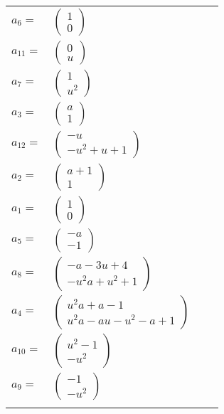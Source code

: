\documentclass[1p]{elsarticle_modified}
\theoremstyle{definition}
\begin{document}
\begin{tabular}{m{7pt} m{180pt} m{7pt} m{180pt} }
\flushright $a_{6}=$&$\begin{pmatrix}1\\0\end{pmatrix}$ \\
\flushright $a_{11}=$&$\begin{pmatrix}0\\u\end{pmatrix}$ \\
\flushright $a_{7}=$&$\begin{pmatrix}1\\u^2\end{pmatrix}$ \\
\flushright $a_{3}=$&$\begin{pmatrix}a\\1\end{pmatrix}$ \\
\flushright $a_{12}=$&$\begin{pmatrix}- u\\- u^2+u+1\end{pmatrix}$ \\
\flushright $a_{2}=$&$\begin{pmatrix}a+1\\1\end{pmatrix}$ \\
\flushright $a_{1}=$&$\begin{pmatrix}1\\0\end{pmatrix}$ \\
\flushright $a_{5}=$&$\begin{pmatrix}- a\\-1\end{pmatrix}$ \\
\flushright $a_{8}=$&$\begin{pmatrix}- a-3 u+4\\- u^2 a+u^2+1\end{pmatrix}$ \\
\flushright $a_{4}=$&$\begin{pmatrix}u^2 a+a-1\\u^2 a- a u- u^2- a+1\end{pmatrix}$ \\
\flushright $a_{10}=$&$\begin{pmatrix}u^2-1\\- u^2\end{pmatrix}$ \\
\flushright $a_{9}=$&$\begin{pmatrix}-1\\- u^2\end{pmatrix}$\\&\end{tabular}
\end{document}
